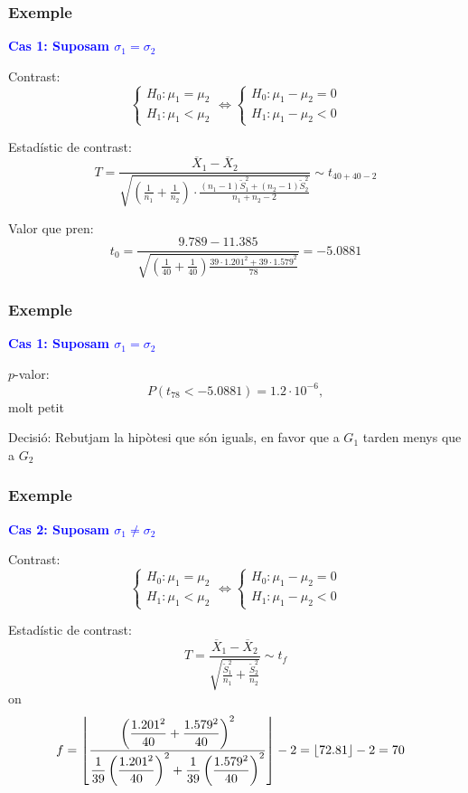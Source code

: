 \documentclass[12pt,t]{beamer}\usepackage[]{graphicx}\usepackage[]{color}
\newcommand{\blue}[1]{\textcolor{blue}{#1}}
\renewcommand{\emph}[1]{{\color{red}#1}}
\theoremstyle{plain}
\theoremstyle{definition}
\begin{document}
\begin{frame}
\frametitle{Exemple}
\vspace*{-2ex}

\textbf{\blue{Cas 1: Suposam $\sigma_1=\sigma_2$}}
\medskip

\emph{Contrast}:
$$
\left\{\begin{array}{l}
H_0:\mu_1=\mu_2\\
H_1:\mu_1< \mu_2
\end{array}\right.
\Longleftrightarrow
\left\{\begin{array}{l}
H_0:\mu_1-\mu_2=0\\
H_1:\mu_1- \mu_2<0
\end{array}\right.
$$

\emph{Estadístic de contrast}: 
$$
T=\frac{\overline{X}_1-\overline{X}_2}%
{\sqrt{(\frac{1}{n_1}+\frac{1}{n_2})\cdot 
\frac{(n_1-1)\widetilde{S}_1^2+(n_2-1)\widetilde{S}_2^2}%
{n_1+n_2-2}}}\sim t_{40+40-2}
$$

\medskip

\emph{Valor que pren}: 
$$
t_0=\frac{9.789-11.385}{\sqrt{(\frac{1}{40}+\frac{1}{40})\frac{39\cdot 1.201^2+39\cdot 1.579^2}{78}}}=-5.0881
$$
\end{frame}

\begin{frame}
\frametitle{Exemple}
\vspace*{-2ex}

\textbf{\blue{Cas 1: Suposam $\sigma_1=\sigma_2$}}
\medskip

\emph{$p$-valor}: 
$$
P(t_{78}<-5.0881)= 1.2\cdot 10^{-6},
$$
molt petit
\medskip

\emph{Decisió}: Rebutjam la hipòtesi que són iguals, en favor que a $G_1$ tarden menys que a $G_2$
\end{frame}




\begin{frame}
\frametitle{Exemple}
\vspace*{-2ex}

\textbf{\blue{Cas 2: Suposam $\sigma_1\neq \sigma_2$}}
\medskip

\emph{Contrast}:
$$
\left\{\begin{array}{l}
H_0:\mu_1=\mu_2\\
H_1:\mu_1< \mu_2
\end{array}\right.
\Longleftrightarrow
\left\{\begin{array}{l}
H_0:\mu_1-\mu_2=0\\
H_1:\mu_1- \mu_2<0
\end{array}\right.
$$

\emph{Estadístic de contrast}: 
$$
T=\frac{\overline{X}_1-\overline{X}_2}{\sqrt{\frac{\widetilde{S}_1^2}{n_1}+\frac{\widetilde{S}_2^2}{n_2}}}\sim t_f
$$
on
{\small
$$
\hspace*{-2ex}f=\left\lfloor\frac{\displaystyle \left( \frac{1.201^2}{40}+\frac{1.579^2}{40}\right)^2}%
{\displaystyle \frac{1}{39}\left(\frac{1.201^2}{40}\right)^2+\frac{1}{39}\left(\frac{1.579^2}{40}\right)^2}\right\rfloor -2
=\lfloor 72.81\rfloor-2=70
$$
}
\end{frame}
\end{document}
